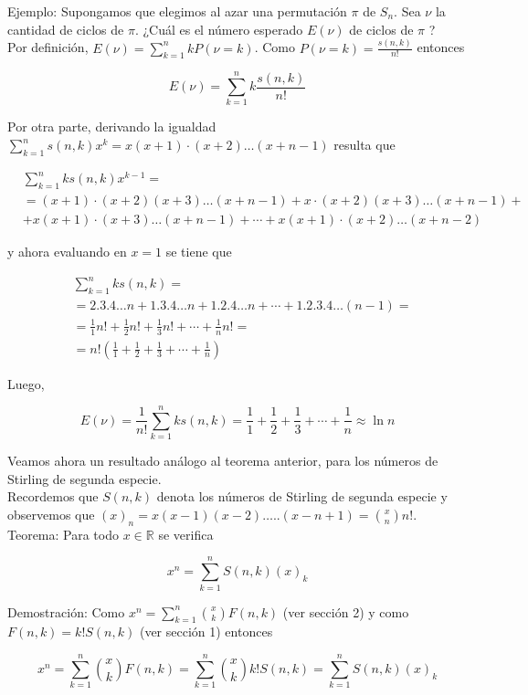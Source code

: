 \documentclass[10pt]{article}
\begin{document}
Ejemplo: Supongamos que elegimos al azar una permutación $\pi$ de $S_{n}$. Sea $\nu$ la cantidad de ciclos de $\pi$. ¿Cuál es el número esperado $E(\nu)$ de ciclos de $\pi$ ?\\
Por definición, $E(\nu)=\sum_{k=1}^{n} k P(\nu=k)$. Como $P(\nu=k)=\frac{s(n, k)}{n!}$ entonces

$$
E(\nu)=\sum_{k=1}^{n} k \frac{s(n, k)}{n!}
$$

Por otra parte, derivando la igualdad $\sum_{k=1}^{n} s(n, k) x^{k}=x(x+1) \cdot(x+2) \ldots(x+n-1)$ resulta que

$$
\begin{aligned}
& \sum_{k=1}^{n} k s(n, k) x^{k-1}= \\
& =(x+1) \cdot(x+2)(x+3) \ldots(x+n-1)+x \cdot(x+2)(x+3) \ldots(x+n-1)+ \\
& +x(x+1) \cdot(x+3) \ldots(x+n-1)+\cdots+x(x+1) \cdot(x+2) \ldots(x+n-2)
\end{aligned}
$$

y ahora evaluando en $x=1$ se tiene que

$$
\begin{aligned}
& \sum_{k=1}^{n} k s(n, k)= \\
& =2.3 .4 \ldots n+1.3 .4 \ldots n+1.2 .4 \ldots n+\cdots+1.2 .3 .4 \ldots(n-1)= \\
& =\frac{1}{1} n!+\frac{1}{2} n!+\frac{1}{3} n!+\cdots+\frac{1}{n} n!= \\
& =n!\left(\frac{1}{1}+\frac{1}{2}+\frac{1}{3}+\cdots+\frac{1}{n}\right)
\end{aligned}
$$

Luego,

$$
E(\nu)=\frac{1}{n!} \sum_{k=1}^{n} k s(n, k)=\frac{1}{1}+\frac{1}{2}+\frac{1}{3}+\cdots+\frac{1}{n} \approx \ln n
$$

Veamos ahora un resultado análogo al teorema anterior, para los números de Stirling de segunda especie.\\
Recordemos que $S(n, k)$ denota los números de Stirling de segunda especie y observemos que $(x)_{n}=x(x-1)(x-2) \ldots . .(x-n+1)=\binom{x}{n} n!$.\\
Teorema: Para todo $x \in \mathbb{R}$ se verifica

$$
x^{n}=\sum_{k=1}^{n} S(n, k)(x)_{k}
$$

Demostración: Como $x^{n}=\sum_{k=1}^{n}\binom{x}{k} F(n, k)$ (ver sección 2) y como $F(n, k)=k!S(n, k)$ (ver sección 1) entonces

$$
x^{n}=\sum_{k=1}^{n}\binom{x}{k} F(n, k)=\sum_{k=1}^{n}\binom{x}{k} k!S(n, k)=\sum_{k=1}^{n} S(n, k)(x)_{k}
$$
\end{document}
